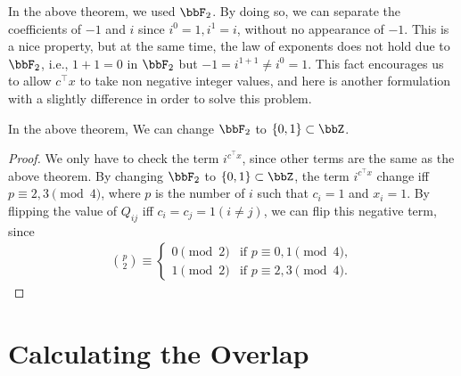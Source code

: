 \documentclass[\main/main]{subfiles}
\begin{document}
In the above theorem, we used $\bbF_2$.
By doing so, we can separate the coefficients of $-1$ and $i$
since $i^0=1,i^1=i$, without no appearance of $-1$.
This is a nice property, but at the same time,
the law of exponents does not hold due to $\bbF_2$,
i.e., $1+1=0$ in $\bbF_2$ but $-1 = i^{1+1} \neq i^{0} = 1$.
This fact encourages us to allow $c^\top x$ to take non negative integer values,
and here is another formulation with a slightly difference
in order to solve this problem.
\begin{corollary}\label{cor:stabilizerStateStandardFormWithZ}
    In the above theorem,
    We can change $\bbF_2$ to $\{0,1\} \subset \bbZ$.
\end{corollary}
\begin{proof}
    We only have to check the term $i^{c^\top x}$,
    since other terms are the same as the above theorem.
    By changing $\bbF_2$ to $\{0,1\} \subset \bbZ$,
    the term $i^{c^\top x}$ change iff $p \equiv 2,3 \pmod 4$,
    where $p$ is the number of $i$ such that $c_i=1$ and $x_i=1$.
    By flipping the value of $Q_{ij}$ iff $c_i=c_j=1(i \neq j)$,
    we can flip this negative term, since
    \begin{align*}
        \binom{p}{2} \equiv \begin{cases}
                                0 \pmod 2 & \text{if $p \equiv 0,1 \pmod 4$}, \\
                                1 \pmod 2 & \text{if $p \equiv 2,3 \pmod 4$}.
                            \end{cases}
    \end{align*}
\end{proof}

\section{Calculating the Overlap}
\end{document}
